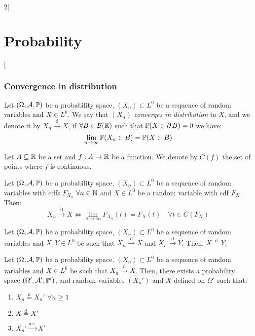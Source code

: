 \documentclass[../../../main.tex]{subfiles}
\begin{document}
\begin{multicols}{2}[\section{Probability}]
    \subsubsection{Convergence in distribution}
    \begin{definition}
        Let $(\Omega,\mathcal{A},\mathbb{P})$ be a probability space, $(X_n)\subset L^0$ be a sequence of random variables and $X\in L^0$. We say that $(X_n)$ \emph{converges in distribution} to $X$, and we denote it by $X_n\overset{\text{d}}{\longrightarrow} X$, if $\forall B\in\mathcal{B}(\mathbb{R})$ such that $\mathbb{P}(X\in\operatorname{\partial} B)=0$ we have: $$\lim_{n\to\infty}\mathbb{P}(X_n\in B)=\mathbb{P}(X\in B)$$
    \end{definition}
    \begin{definition}
        Let $A\subseteq\mathbb{R}$ be a set and $f:A\rightarrow\mathbb{R}$ be a function. We denote by $C(f)$ the set of points where $f$ is continuous.
    \end{definition}
    \begin{prop}
        Let $(\Omega,\mathcal{A},\mathbb{P})$ be a probability space, $(X_n)\subset L^0$ be a sequence of random variables with cdfs $F_{X_n}$ $\forall n\in\mathbb{N}$ and $X\in L^0$ be a random variable with cdf $F_X$. Then: $$X_n\overset{\text{d}}{\longrightarrow} X\iff\lim_{n\to\infty} F_{X_n}(t)=F_X(t)\quad\forall t\in C(F_X)$$
    \end{prop}
    \begin{prop}
        Let $(\Omega,\mathcal{A},\mathbb{P})$ be a probability space, $(X_n)\subset L^0$ be a sequence of random variables and $X,Y\in L^0$ be such that $X_n\overset{\text{d}}{\longrightarrow} X$ and $X_n\overset{\text{d}}{\longrightarrow} Y$. Then, $X\overset{\text{d}}{=}Y$.
    \end{prop}
    \begin{theorem}
        Let $(\Omega,\mathcal{A},\mathbb{P})$ be a probability space, $(X_n)\subset L^0$ be a sequence of random variables and $X\in L^0$ be such that $X_n\overset{\text{d}}{\longrightarrow} X$. Then, there exists a probability space $(\Omega',\mathcal{A}',\mathbb{P}')$, and random variables $({X_n}')$ and $X$ defined on $\Omega'$ such that:
        \begin{enumerate}
            \item $X_n\overset{\text{d}}{=}{X_n}'$ $\forall n\geq 1$
            \item $X\overset{\text{d}}{=}X'$
            \item ${X_n}'\overset{\text{a.s.}}{\longrightarrow}X'$
        \end{enumerate}

\end{theorem}
\end{multicols}
\end{document}
